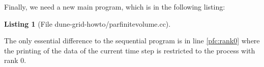 \documentclass[11pt,a4paper,headinclude,footinclude,DIV16,normalheadings]{scrreprt}
\newtheorem{lst}{Listing}
\begin{document}
Finally, we need a new main program, which is in the following listing: 

\begin{lst}[File dune-grid-howto/parfinitevolume.cc] \mbox{}
\nopagebreak

\end{lst}

The only essential difference to the sequential program is in line
\ref{pfc:rank0} where the printing of the data of the current time
step is restricted to the process with rank 0.









 



\end{document}
